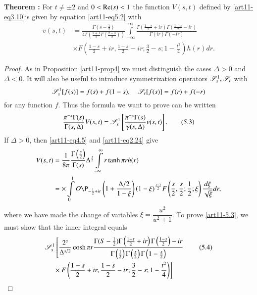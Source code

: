 \medskip
\noindent
{\bfseries Theorem :\label{art11-thm5}}
For $t \neq \pm 2$ and $0 < \operatorname{Re} (s) < 1$ the function $V(s,t)$ defined by \eqref{art11-eq3.10}\pageoriginale  is given by equation \eqref{art11-eq5.2} with 
\begin{align*}
v(s,t)& =\frac{\Gamma(s - \frac{1}{2})}{4 \Gamma \left(\frac{s+1}{2}  \Gamma \left(\frac{2-s}{2} \right)\right)} \int\limits^\infty_{-\infty} \frac{\Gamma \left(\frac{1-s}{2} + ir \right) \Gamma \left(\frac{1-s}{2} - ir \right)}{\Gamma (ir) \Gamma (-ir)}\\
& \times F \left(\frac{1-s}{2} + ir, \frac{1-s}{2} - ir; \frac{3}{2} -s ; 1 - \frac{t^2}{4} \right) h(r) dr. 
\end{align*} 

\begin{proof}
As in Proposition \eqref{art11-prop4} we must distinguish the cases $\Delta > 0$ and $\Delta < 0$. It will also be useful  to introduce symmetrization operators $\mathscr{S}^1_s, \mathscr{S}_r$ with 
$$
\mathscr{S}^1_s [f(s)] = f(s) + f (1-s), \quad \mathscr{S}_r [f(s)] = f(r) + f (-r)
$$
for any function $f$. Thus the formula we want to prove can be written 
\begin{equation*}
\frac{\pi^{-s} \Gamma (s)}{\Gamma (s, \Delta)} V (s,t) = \mathscr{S}^1_s \left[\frac{\pi^{-s} \Gamma (s)}{\gamma (s, \Delta)} v (s,t) \right].
\tag{5.3}\label{art11-eq5.3}
\end{equation*}
If $\Delta >0$, then \eqref{art11-eq4.5} and \eqref{art11-eq2.24} give 
\begin{align*}
V(s,t) & =\frac{1}{8\pi} \frac{\Gamma \left(\frac{s}{2} \right)}{\Gamma (s)} \Delta^{\frac{s}{2}} \int\limits^\infty_{-\infty} r \tanh \pi r h (r)\\
& =\times \int\limits^1_0 O\P_{-\frac{1}{2} + ir} \left(1+ \frac{\Delta/ 2}{1-\xi} \right) (1-\xi)^{\frac{s-3}{2}} F \left(\frac{s}{2}, \frac{s}{2}; \frac{1}{2} ; \xi \right) \frac{d\xi}{\sqrt{\xi}} dr, 
\end{align*}
where we have made the change of variables $\xi =\dfrac{u^2}{u^2+1}$. To prove \eqref{art11-5.3}, we must show that the inner integral equals 
\begin{align*}
& \sS^1_s \left[\frac{2^s}{\Delta^{s/2}} \cosh \pi r \frac{\Gamma (S-\frac{1}{2}) \Gamma \left(\frac{1-s}{2} + ir \right) \Gamma \left(\frac{1-s}{2}\right) -ir}{\Gamma \left(\frac{1}{2} \right) \Gamma \left(\frac{s}{2} \right) \Gamma \left(1-\frac{s}{2} \right)} \right.
\tag{5.4}\label{art11-eq5.4}\\
&\quad \left. {}\times F\left(\frac{1-s}{2} + i r, \frac{1-s}{2} - ir ; \frac{3}{2} - s ; 1 - \frac{t^2}{4} \right) \right]

\end{align*}
\end{proof}

